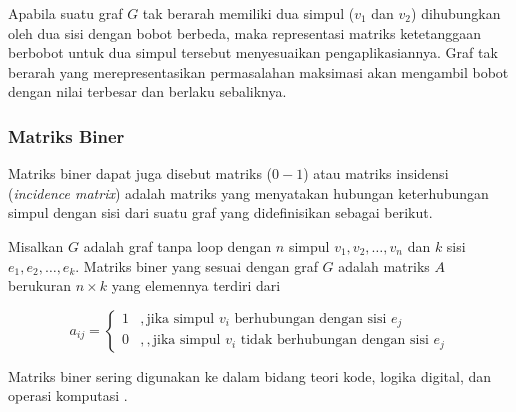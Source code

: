 {{{\begin{contoh}
{                }
            \end{contoh}

            Apabila suatu graf $G$ tak berarah memiliki dua simpul ($v_{1}$ dan $v_{2}$) dihubungkan oleh dua sisi dengan bobot berbeda,
            maka representasi matriks ketetanggaan berbobot untuk dua simpul tersebut menyesuaikan pengaplikasiannya. Graf tak berarah yang merepresentasikan
            permasalahan maksimasi akan mengambil bobot dengan nilai terbesar dan berlaku sebaliknya.
        }

        \vspace{-5mm}
        \subsubsection{Matriks Biner}
        {\frenchspacing
            Matriks biner dapat juga disebut matriks ($0-1$) atau matriks insidensi (\textit{incidence matrix}) adalah matriks
            yang menyatakan hubungan keterhubungan simpul dengan sisi dari suatu graf yang didefinisikan sebagai berikut.
            \begin{definisi}
                \label{def:Definisi Matriks Biner}
                Misalkan $G$ adalah graf tanpa loop dengan $n$ simpul $v_{1},v_{2},\dots,v_{n}$ dan $k$ sisi $e_{1},e_{2},\dots,e_{k}$.
                Matriks biner yang sesuai dengan graf $G$ adalah matriks $A$ berukuran $n\times k$ yang elemennya terdiri dari

                \begin{equation}
                    a_{ij} = \begin{cases} 1 & ,\text{jika simpul $v_{i}$ berhubungan dengan sisi $e_{j}$} \\ 0 &,,\text{jika simpul $v_{i}$ tidak berhubungan dengan sisi $e_{j}$} \end{cases}
                    \label{pers:Definisi Matriks Biner}
                \end{equation}

            \end{definisi}
            \noindent
            Matriks biner sering digunakan ke dalam bidang teori kode, logika digital, dan operasi komputasi .
        }
    }
}
\vspace{-3mm}

